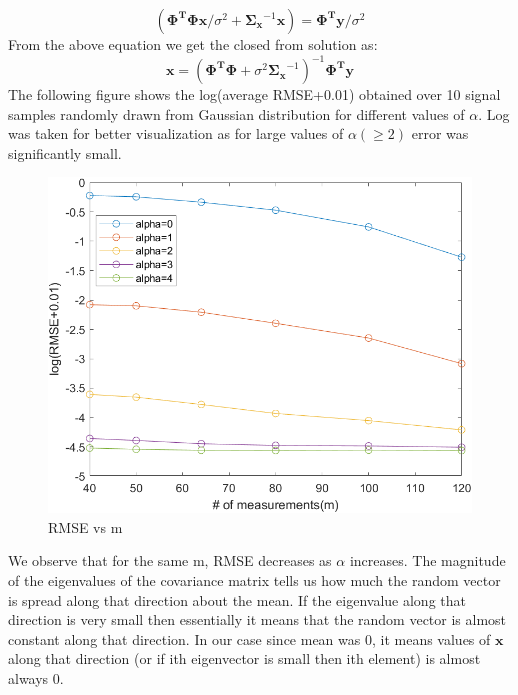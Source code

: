 \documentclass[12pt]{article}
\begin{document}
\begin{equation*}
	(\boldsymbol{\Phi^T \Phi x}/\sigma^2+\boldsymbol{\Sigma_x}^{-1}\boldsymbol{x}) = \boldsymbol{\Phi^T}\boldsymbol{y}/\sigma^2
\end{equation*}
From the above equation we get the closed from solution as:
\begin{equation*}
	\boldsymbol{x}= (\boldsymbol{\Phi^T \Phi}+\sigma^2\boldsymbol{\Sigma_x}^{-1})^{-1}\boldsymbol{\Phi^T}\boldsymbol{y}
\end{equation*}
The following figure shows the log(average RMSE+0.01) obtained over 10 signal samples randomly drawn from Gaussian distribution for different values of $\alpha$. Log was taken for better visualization as for large values of $\alpha(\geq 2)$ error was significantly small.

\begin{figure}[H]
	\centering
	\includegraphics[scale=0.75]{rmse.png}  %
	\caption{RMSE vs m}
	\label{fig:1}
\end{figure}
We observe that for the same m, RMSE decreases as $\alpha$ increases. The magnitude of the eigenvalues of the covariance matrix tells us how much the random vector is spread along that direction about the mean. If the eigenvalue along that direction is very small then essentially it means that the random vector is almost constant along that direction. In our case since mean was 0, it means values of $\boldsymbol{x}$ along that direction (or if ith eigenvector is small then ith element) is almost always 0.\\
\end{document}

